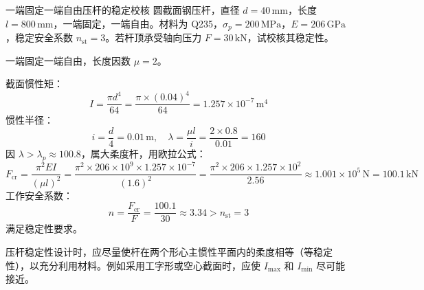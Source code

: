 \begin{example}{一端固定一端自由压杆的稳定校核}
    圆截面钢压杆，直径 \(d = 40 \,\text{mm}\)，长度 \(l = 800 \,\text{mm}\)，一端固定，一端自由。材料为 Q235，\(\sigma_p = 200 \,\text{MPa}\)，\(E = 206 \,\text{GPa}\)，稳定安全系数 \(n_{\text{st}} = 3\)。若杆顶承受轴向压力 \(F = 30 \,\text{kN}\)，试校核其稳定性。
\end{example}

\begin{solution}
一端固定一端自由，长度因数 \(\mu = 2\)。

截面惯性矩：
\[
I = \frac{\pi d^4}{64} = \frac{\pi \times (0.04)^4}{64} = 1.257 \times 10^{-7} \,\text{m}^4
\]
惯性半径：
\[
i = \frac{d}{4} = 0.01 \,\text{m},\quad \lambda = \frac{\mu l}{i} = \frac{2 \times 0.8}{0.01} = 160
\]
因 \(\lambda > \lambda_p \approx 100.8\)，属大柔度杆，用欧拉公式：
\[
F_{\text{cr}} = \frac{\pi^2 EI}{(\mu l)^2} = \frac{\pi^2 \times 206\times10^9 \times 1.257\times10^{-7}}{(1.6)^2}
= \frac{\pi^2 \times 206 \times 1.257 \times 10^2}{2.56} \approx 1.001 \times 10^5 \,\text{N} = 100.1 \,\text{kN}
\]
工作安全系数：
\[
n = \frac{F_{\text{cr}}}{F} = \frac{100.1}{30} \approx 3.34 > n_{\text{st}} = 3
\]
满足稳定性要求。
\end{solution}

\begin{remark}
    压杆稳定性设计时，应尽量使杆在两个形心主惯性平面内的柔度相等（等稳定性），以充分利用材料。例如采用工字形或空心截面时，应使 \(I_{\max}\) 和 \(I_{\min}\) 尽可能接近。
\end{remark}

